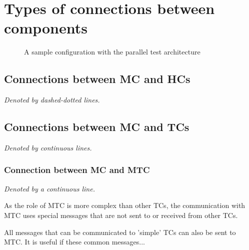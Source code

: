 \documentclass[a4paper,10pt]{article}
\begin{document}
\section{Types of connections between components}

\begin{figure}[!ht]
\begin{center}
{}
\end{center}
\caption{\label{figure:parallelarch}A sample configuration with the parallel test architecture}
\end{figure}

\subsection{Connections between MC and HCs}

\emph{Denoted by dashed-dotted lines.}

\subsection{Connections between MC and TCs}

\emph{Denoted by continuous lines.}

\subsubsection{Connection between MC and MTC}

\emph{Denoted by a continuous line.}

As the role of MTC is more complex than other TCs, the communication with MTC uses special messages that are not sent to or received from other TCs.

All messages that can be communicated to 'simple' TCs can also be sent to MTC. It is useful if these common messages...
\end{document}
